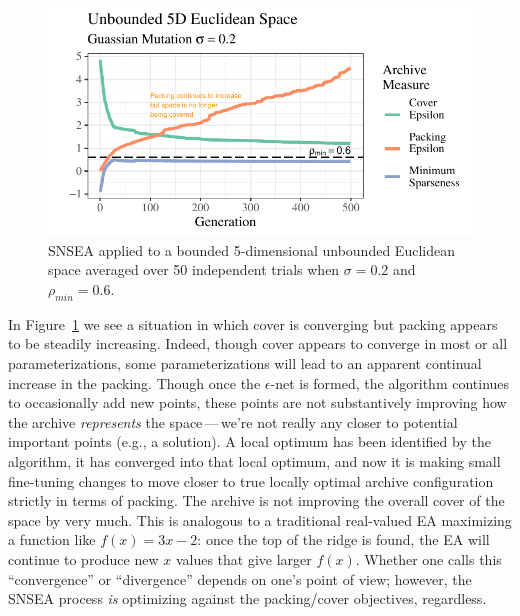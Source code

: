 \documentclass[twoside]{article}
\begin{document}
%
\begin{figure}[t]
  \center\includegraphics[width=1\textwidth]{Figures/unbounded-s02-r06-NOPOP.pdf}
  \caption{\label{fig:unbounded:nopop:0206} SNSEA applied to a bounded 5-dimensional unbounded Euclidean space averaged over 50 independent trials when $\sigma=0.2$ and $\rho_{min}=0.6$.}
\end{figure}
%
In Figure~\ref{fig:unbounded:nopop:0206} we see a situation in which cover is converging but packing appears to be steadily increasing.  Indeed, though cover appears to converge in most or all parameterizations, some parameterizations will lead to an apparent continual increase in the packing.  Though once the $\epsilon$-net is formed, the algorithm continues to occasionally add new points, these points are not substantively improving how the archive \emph{represents} the space\,---\,we're not really any closer to potential important points (e.g., a solution).  A local optimum has been identified by the algorithm, it has converged into that local optimum, and now it is making small fine-tuning changes to move closer to true locally optimal archive configuration strictly in terms of packing.  The archive is not improving the overall cover of the space by very much.  This is analogous to a traditional real-valued EA maximizing a function like $f(x)=3x - 2$: once the top of the ridge is found, the EA will continue to produce new $x$ values that give larger $f(x)$.  Whether one calls this ``convergence'' or ``divergence'' depends on one's point of view; however, the SNSEA process \emph{is} optimizing against the packing/cover objectives, regardless.
\end{document}

